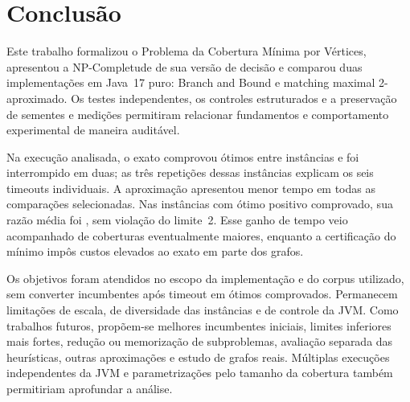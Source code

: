 \section{Conclusão}
\label{sec:conclusion}

Este trabalho formalizou o Problema da Cobertura Mínima
por Vértices, apresentou a NP-Completude de sua versão
de decisão e comparou duas implementações em Java~17
puro: Branch and Bound e matching maximal
2-aproximado. Os testes independentes, os controles
estruturados e a preservação de sementes e medições
permitiram relacionar fundamentos e comportamento
experimental de maneira auditável.

Na execução analisada, o exato comprovou
\OptimalInstances{} ótimos entre \TotalInstances{}
instâncias e foi interrompido em duas; as três repetições
dessas instâncias explicam os seis timeouts individuais.
A aproximação apresentou menor tempo em todas as
comparações selecionadas. Nas \QualityInstances{}
instâncias com ótimo positivo comprovado, sua razão
média foi \MeanRatio{}, sem violação do limite~2.
Esse ganho de tempo veio acompanhado de coberturas
eventualmente maiores, enquanto a certificação do mínimo
impôs custos elevados ao exato em parte dos grafos.

Os objetivos foram atendidos no escopo da implementação
e do corpus utilizado, sem converter incumbentes após
timeout em ótimos comprovados. Permanecem limitações
de escala, de diversidade das instâncias e de controle
da JVM. Como trabalhos futuros, propõem-se melhores
incumbentes iniciais, limites inferiores mais fortes,
redução ou memorização de subproblemas, avaliação
separada das heurísticas, outras aproximações e estudo
de grafos reais. Múltiplas execuções independentes da
JVM e parametrizações pelo tamanho da cobertura
também permitiriam aprofundar a análise.
